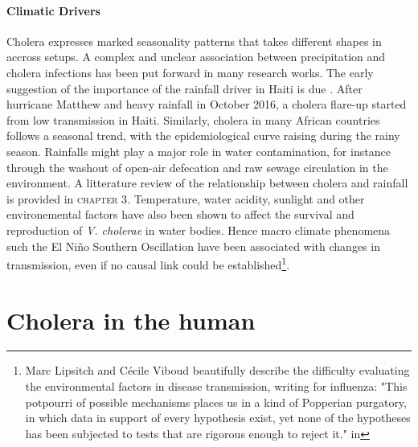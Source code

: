 \paragraph{Climatic Drivers} Cholera expresses marked seasonality patterns that takes different shapes in accross setups. A complex and unclear association between precipitation and cholera infections has been put forward in many research works. The early suggestion of the importance of the rainfall driver in Haiti is due \textcite{Gaudart:SpatioTemporalDynamicsCholera:2013}. After hurricane Matthew and heavy rainfall in October 2016, a cholera flare-up started from low transmission in Haiti\cite{Pasetto:RealtimeForecastingCholera:2018}. Similarly, cholera in many African countries follows a seasonal trend, with the epidemiological curve raising during the rainy season\cite{Baracchini:SeasonalityCholeraDynamics:2017}.  Rainfalls might play a major role in water contamination, for instance through the washout of open-air defecation and raw sewage circulation in the environment. A litterature review of the relationship between cholera and rainfall is provided in \textsc{chapter 3}. Temperature, water acidity, sunlight and other environemental factors have also been shown to affect the survival and reproduction of \textit{V. cholerae} in water bodies. Hence macro climate phenomena such the El Niño Southern Oscillation have been associated with changes in transmission, even if no causal link could be established\cite[-2\baselineskip]{Pascual:CholeraDynamicsNinoSouthern:2000}\footnote{Marc Lipsitch and Cécile Viboud beautifully describe the difficulty evaluating the environmental factors in disease transmission, writing for influenza: "This potpourri of possible mechanisms places us in a kind of Popperian purgatory, in which data in support of every hypothesis exist, yet none of the hypotheses has been subjected to tests that are rigorous enough to reject it." in }.

\section{Cholera in the human} 
